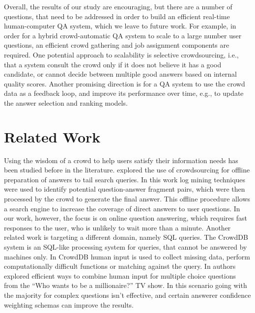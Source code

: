 \documentclass[11pt,letterpaper]{article}
\begin{document}
Overall, the results of our study are encouraging, but there are a number of questions, that need to be addressed in order to build an efficient real-time human-computer QA system, which we leave to future work.
For example, in order for a hybrid crowd-automatic QA system to scale to a large number user questions, an efficient crowd gathering and job assignment components are required\cite{bernstein2011crowds}.
One potential approach to scalability is selective crowdsourcing, i.e., that a system consult the crowd only if it does not believe it has a good candidate, or cannot decide between multiple good answers based on internal quality scores. Another promising direction is for a QA system to use the crowd data as a feedback loop, and improve its performance over time, e.g., to update the answer selection and ranking models.



\section{Related Work}
\label{sec:related_work}

Using the wisdom of a crowd to help users satisfy their information needs has been studied before in the literature.
 explored the use of crowdsourcing for offline preparation of answers to tail search queries.
In this work log mining techniques were used to identify potential question-answer fragment pairs, which were then processed by the crowd to generate the final answer.
This offline procedure allows a search engine to increase the coverage of direct answers to user questions.
In our work, however, the focus is on online question answering, which requires fast responses to the user, who is unlikely to wait more than a minute.
Another related work is targeting a different domain, namely SQL queries.
The CrowdDB system \cite{franklin2011crowddb} is an SQL-like processing system for queries, that cannot be answered by machines only.
In CrowdDB human input is used to collect missing data, perform computationally difficult functions or matching against the query.
In  authors explored efficient ways to combine human input for multiple choice questions from the ``Who wants to be a millionaire?'' TV show.
In this scenario going with the majority for complex questions isn't effective, and certain answerer confidence weighting schemas can improve the results.  
\end{document}
